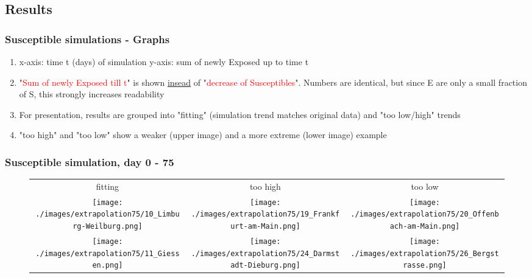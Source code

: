 \documentclass{beamer}
\begin{document}
\subsection{Results}
\begin{frame}
	\frametitle{Susceptible simulations - Graphs}
	\begin{enumerate}[$\bullet$]
		\item x-axis: time t (days) of simulation \newline
			y-axis: sum of newly Exposed up to time t
		\item "\textcolor{red}{Sum of newly Exposed till t}" is shown \underline{insead} of "\textcolor{red}{decrease of Susceptibles}". Numbers are identical,
			but since E are only a small fraction of S, this strongly increases readability
		\item For presentation, results are grouped into "fitting" (simulation trend matches original data) and "too low/high" trends
		\item "too high" and "too low" show a weaker (upper image) and a more extreme (lower image) example
	\end{enumerate}
\end{frame}

\begin{frame}
	\frametitle{Susceptible simulation, day 0 - 75}
	\begin{center}
		\begin{figure}
			\begin{adjustwidth}{-0.8cm}{}
			\begin{tabular}{c|c|c}
				fitting & too high & too low \\
				\texttt{[image: ./images/extrapolation75/10\_Limburg-Weilburg.png]}
					& \texttt{[image: ./images/extrapolation75/19\_Frankfurt-am-Main.png]}
					& \texttt{[image: ./images/extrapolation75/20\_Offenbach-am-Main.png]} \\
				\texttt{[image: ./images/extrapolation75/11\_Giessen.png]}
					& \texttt{[image: ./images/extrapolation75/24\_Darmstadt-Dieburg.png]}
					& \texttt{[image: ./images/extrapolation75/26\_Bergstrasse.png]}
			\end{tabular}
			\end{adjustwidth}
		\end{figure}
	\end{center}
\end{frame}
\end{document}
